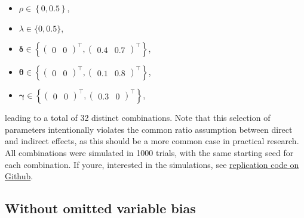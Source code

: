 \documentclass[
  letterpaper,
]{scrbook}
\providecommand{\tightlist}{%
  \setlength{\itemsep}{0pt}\setlength{\parskip}{0pt}}\usepackage{longtable,booktabs,array}
\begin{document}
\begin{itemize}
\tightlist
\item
  \(\rho \in \left\{ 0, 0.5\right\}\),
\item
  \(\lambda \in \{0, 0.5\}\),
\item
  \({\boldsymbol{\mathbf{\delta}}} \in \left\{ %
  \begin{pmatrix}0&0\end{pmatrix}
  ^\intercal, %
  \begin{pmatrix}0.4&0.7\end{pmatrix}
  ^\intercal\right\}\),
\item
  \({\boldsymbol{\mathbf{\theta}}} \in \left\{%
  \begin{pmatrix}0&0\end{pmatrix}
  ^\intercal, %
  \begin{pmatrix}0.1&0.8\end{pmatrix}
  ^\intercal\right\}\),
\item
  \({\boldsymbol{\mathbf{\gamma}}} \in \left\{%
  \begin{pmatrix}0&0\end{pmatrix}
  ^\intercal, %
  \begin{pmatrix}0.3&0\end{pmatrix}
  ^\intercal\right\}\),
\end{itemize}

leading to a total of 32 distinct combinations. Note that this selection
of parameters intentionally violates the common ratio assumption between
direct and indirect effects, as this should be a more common case in
practical research. All combinations were simulated in 1000 trials, with
the same starting seed for each combination. If youre, interested in the
simulations, see
\href{https://github.com/ruettenauer/Reproduction-Material-Spatial-Monte-Carlo-Experiments}{replication
code on Github}.

\hypertarget{without-omitted-variable-bias}{%
\subsection{Without omitted variable
bias}\label{without-omitted-variable-bias}}
\end{document}
